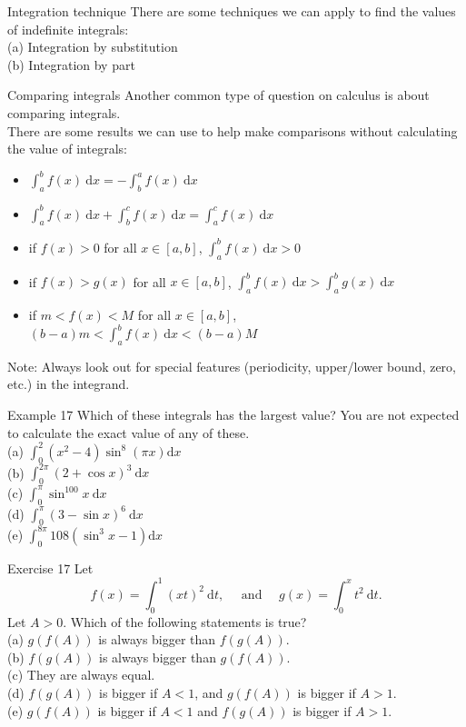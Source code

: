 \documentclass{beamer}
\begin{document}
\begin{frame}{Integration technique}
    There are some techniques we can apply to find the values of indefinite integrals:\\
    (a) Integration by substitution\\
    (b) Integration by part
\end{frame}

\begin{frame}{Comparing integrals}
Another common type of question on calculus is about comparing integrals.\\
There are some results we can use to help make comparisons without calculating the value of integrals:\\
\begin{itemize}
    \item $\int_a^b f(x) \mathrm{~d} x=-\int_b^a f(x) \mathrm{~d} x$
    \item $\int_a^b f(x) \mathrm{~d} x+\int_b^c f(x) \mathrm{~d} x=\int_a^c f(x) \mathrm{~d} x$
    \item if $f(x)>0$ for all $x\in [a,b]$, $\int_a^b f(x) \mathrm{~d} x>0$
    \item if $f(x)>g(x)$ for all $x\in [a,b]$, $\int_a^b f(x) \mathrm{~d} x>\int_a^b g(x) \mathrm{~d} x$
    \item if $m<f(x)<M$ for all $x \in [a,b]$, $(b-a)m<\int_a^b f(x) \mathrm{~d} x<(b-a)M$
\end{itemize}
Note: Always look out for special features (periodicity, upper/lower bound, zero, etc.) in the integrand.
\end{frame}

\begin{frame}{Example 17}
Which of these integrals has the largest value? You are not expected to calculate the exact value of any of these.\\
(a) $\int_0^2\left(x^2-4\right) \sin ^8(\pi x) \mathrm{d} x$\\
(b) $\int_0^{2 \pi}(2+\cos x)^3 \mathrm{~d} x$\\
(c) $\int_0^\pi \sin ^{100} x \mathrm{~d} x$\\
(d) $\int_0^\pi(3-\sin x)^6 \mathrm{~d} x$\\
(e) $\int_0^{8 \pi} 108\left(\sin ^3 x-1\right) \mathrm{d} x$\\
\end{frame}

\begin{frame}{Exercise 17}
Let
$$
f(x)=\int_0^1(x t)^2 \mathrm{~d} t, \quad \text { and } \quad g(x)=\int_0^x t^2 \mathrm{~d} t .
$$
Let $A>0$. Which of the following statements is true?\\
(a) $g(f(A))$ is always bigger than $f(g(A))$.\\
(b) $f(g(A))$ is always bigger than $g(f(A))$.\\
(c) They are always equal.\\
(d) $f(g(A))$ is bigger if $A<1$, and $g(f(A))$ is bigger if $A>1$.\\
(e) $g(f(A))$ is bigger if $A<1$ and $f(g(A))$ is bigger if $A>1$.
    
\end{frame}
\end{document}
